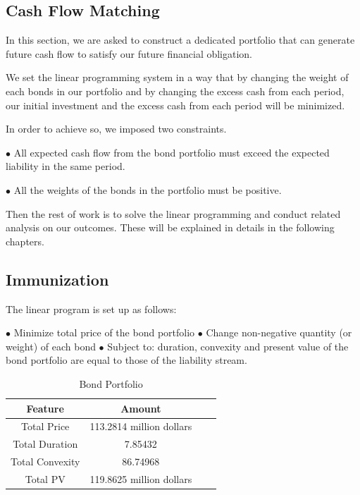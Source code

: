 \documentclass[oneside,12pt]{report}
\begin{document}
\subsection{Cash Flow Matching}

In this section, we are asked to construct a dedicated portfolio that can generate future cash flow to satisfy our future financial obligation.

 We set the linear programming system in a way that by changing the weight of each bonds in our portfolio and by changing the excess cash from each period, our initial investment and the excess cash from each period will be minimized. 

In order to achieve so, we imposed two constraints. 

\noindent $\bullet$ All expected cash flow from the bond portfolio must exceed the expected liability in the same period.

$\bullet$ All the weights of the bonds in the portfolio must be positive.  

Then the rest of work is to solve the linear programming and conduct related analysis on our outcomes. These will be explained in details in the following chapters.

\subsection{Immunization}
\vspace{8pt}
The linear program is set up as follows:

\noindent $\bullet$ Minimize total price of the bond portfolio
\noindent $\bullet$ Change non-negative quantity (or weight) of each bond
\noindent $\bullet$ Subject to: duration, convexity and present value of the bond portfolio are equal to those of the liability stream.

\begin{table}[h]
\centering  
\begin{tabular}{cccc}
\hline
Feature  &Amount\\ \hline 
Total Price  &113.2814 million dollars\\
Total Duration  &7.85432\\ 
Total Convexity  &86.74968\\ 
Total PV  &119.8625 million dollars\\ 
\hline
\end{tabular}
\caption{Bond Portfolio	}
\end{table}
　
	
	
\end{document}
